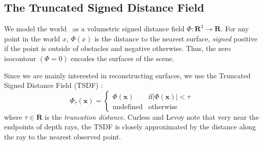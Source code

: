 \documentclass[conference]{IEEEtran}
\begin{document}
\subsection{The Truncated Signed Distance Field}
\label{section:TSDF}
We model the world~\cite{Curless1996} as a volumetric signed distance field $\Phi: \mathbf{R}^3
\to \mathbf{R}$. For any point in the world $x$, $\Phi(x)$
is the distance to the nearest surface, \emph{signed} positive if the point is
outside of obstacles and negative otherwise. Thus, the zero isocontour $(\Phi =
0)$ encodes the surfaces of the scene.

Since we are mainly interested in reconstructing surfaces,
we use the Truncated Signed Distance Field (TSDF) \cite{Curless1996}:
\begin{equation}
	\Phi_{\tau}(\mathbf{x}) =
	\begin{cases}
		\Phi(\mathbf{x}) &  \text{if} |\Phi(\mathbf{x})| < \tau \\
		\text{undefined} & \text{otherwise}
	\end{cases}
\end{equation}
where $\tau \in \mathbf{R}$ is the \emph{truncation distance}.  Curless and
Levoy \cite{Curless1996} note that very near the endpoints of depth rays, the
TSDF is closely approximated by the distance along the ray to the nearest observed
point.   
 
\end{document}
